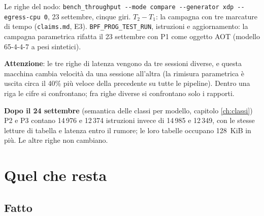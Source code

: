 \documentclass[11pt,a4paper,oneside]{report}
\begin{document}
\begin{prima}
Le righe del nodo: \texttt{bench\_throughput -{}-mode compare -{}-generator xdp
-{}-egress-cpu 0}, 23 settembre, cinque giri. $T_2-T_1$: la campagna con tre
marcature di tempo (\texttt{claims.md}, E3). \texttt{BPF\_PROG\_TEST\_RUN},
istruzioni e aggiornamento: la campagna parametrica rifatta il 23 settembre con P1
come oggetto AOT (modello 65-4-4-7 a pesi sintetici).

\textbf{Attenzione}: le tre righe di latenza vengono da tre sessioni diverse, e
questa macchina cambia velocità da una sessione all'altra (la rimisura
parametrica è uscita circa il 40\% più veloce della precedente su tutte le
pipeline). Dentro una riga le cifre si confrontano; fra righe diverse si
confrontano solo i rapporti.

\textbf{Dopo il 24 settembre} (semantica delle classi per modello, capitolo
\ref{ch:classi}) P2 e P3 contano 14\,976 e 12\,374 istruzioni invece di
14\,985 e 12\,349, con le stesse letture di tabella e latenza entro il rumore;
le loro tabelle occupano 128~KiB in più. Le altre righe non cambiano.
\end{prima}

\chapter{Quel che resta}

\section{Fatto}
\end{document}
